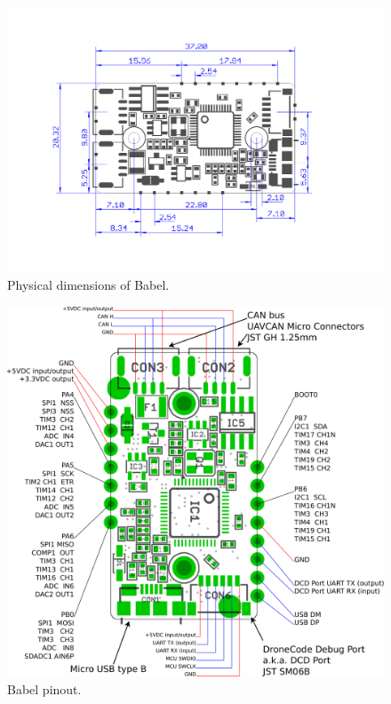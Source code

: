\documentclass{zubaxdoc}
\begin{document}
\begin{figure}[hbtp]
	\centerline{\includegraphics[width=1.2\textwidth]{babel_dimensions}}
	\caption{Physical dimensions of Babel.\label{fig:drawing}}
\end{figure}

\begin{figure}[hbtp]
	\centerline{\includegraphics[width=1\textwidth]{pinout_annotated}}
	\vspace{2em}
	\caption{Babel pinout.\label{fig:pinout}}
\end{figure}
\end{document}
